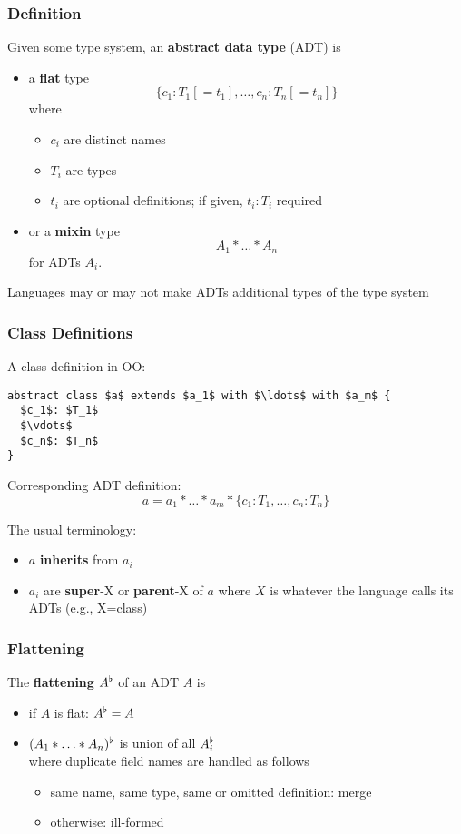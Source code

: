 \begin{frame}\frametitle{Definition}
Given some type system, an \textbf{abstract data type} (ADT) is
\begin{itemize}
\item a \textbf{flat} type
  \[\{c_1:T_1[=t_1],\ldots,c_n:T_n[=t_n]\}\]
  where
  \begin{itemize}
  \item $c_i$ are distinct names
  \item $T_i$ are types
  \item $t_i$ are optional definitions; if given, $t_i:T_i$ required
  \end{itemize}
\item or a \textbf{mixin} type
  \[A_1*\ldots*A_n\]
  for ADTs $A_i$.
\end{itemize}

Languages may or may not make ADTs additional types of the type system
\end{frame}

\begin{frame}[fragile]\frametitle{Class Definitions}
A class definition in OO:

\begin{lstlisting}
abstract class $a$ extends $a_1$ with $\ldots$ with $a_m$ {
  $c_1$: $T_1$
  $\vdots$
  $c_n$: $T_n$
}
\end{lstlisting}

Corresponding ADT definition:
\[a = a_1*\ldots*a_m*\{c_1:T_1,\ldots,c_n:T_n\}\]
\medskip

The usual terminology:
\begin{itemize}
\item $a$ \textbf{inherits} from $a_i$
\item $a_i$ are \textbf{super}-X or \textbf{parent}-X of $a$ where $X$ is whatever the language calls its ADTs (e.g., X=class)
\end{itemize}
\end{frame}

\begin{frame}\frametitle{Flattening}
The \textbf{flattening} $A^\flat$ of an ADT $A$ is
\begin{itemize}
 \item if $A$ is flat: $A^\flat=A$
 \item $(A_1*\ldots*A_n)^\flat$ is union of all $A_i^\flat$\\
  where duplicate field names are handled as follows
  \begin{itemize}
   \item same name, same type, same or omitted definition: merge
   \item otherwise: ill-formed
  \end{itemize}
\end{itemize}
\end{frame}

